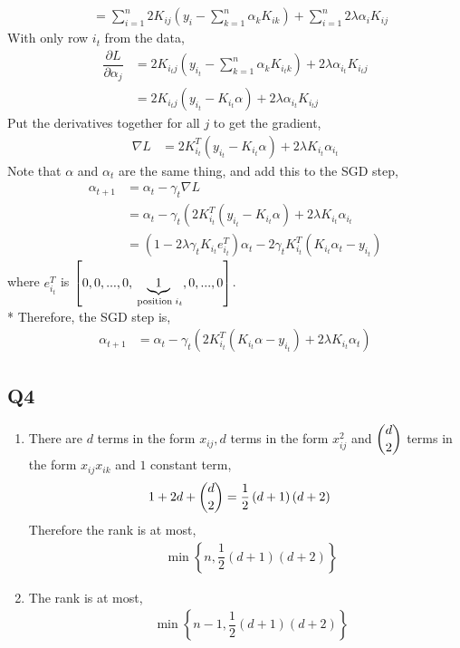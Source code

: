 \documentclass{article}
\begin{document}
\begin{enumerate}
\begin{align*}
\\ &= \displaystyle\sum_{i=1}^{n} 2 K_{ij} \left(y_{i} - \displaystyle\sum_{k=1}^{n} \alpha_{k} K_{ik}\right) + \displaystyle\sum_{i=1}^{n} 2 \lambda \alpha_{i} K_{ij}
\end{align*}
With only row $i_{t}$ from the data,
\begin{align*}
\dfrac{\partial L}{\partial \alpha_{j}} &= 2 K_{i_{t} j} \left(y_{i_{t}} - \displaystyle\sum_{k=1}^{n} \alpha_{k} K_{i_{t} k}\right) + 2 \lambda \alpha_{i_{t}} K_{i_{t} j}
\\ &= 2 K_{i_{t} j} \left(y_{i_{t}} - K_{i_{t}} \alpha\right) + 2 \lambda \alpha_{i_{t}} K_{i_{t} j}
\end{align*}
Put the derivatives together for all $j $ to get the gradient,
\begin{align*}
\nabla  L &= 2 K_{i_{t}}^{T} \left(y_{i_{t}} - K_{i_{t}} \alpha\right) + 2 \lambda K_{i_{t}} \alpha_{i_{t}}
\end{align*}
Note that $\alpha$ and $\alpha_{t}$ are the same thing, and add this to the SGD step,
\begin{align*}
\alpha_{t+1} &= \alpha_{t} - \gamma_{t} \nabla  L
\\ &= \alpha_{t} - \gamma_{t} \left(2 K_{i_{t}}^{T} \left(y_{i_{t}} - K_{i_{t}} \alpha\right) + 2 \lambda K_{i_{t}} \alpha_{i_{t}}\right.
\\ &= \left(1 - 2 \lambda \gamma_{t} K_{i_{t}} e_{i_{t}}^{T}\right) \alpha_{t} - 2 \gamma_{t} K_{i_{t}}^{T} \left(K_{i_{t}} \alpha_{t} - y_{i_{t}}\right)
\end{align*}
where $e_{i_{t}}^{T}$ is $\left[0, 0, ..., 0, \underbrace{1}_{\text{\;position\;} i_{t}}, 0, ..., 0\right]$.
\\* Therefore, the SGD step is,
\begin{align*}
\alpha_{t+1} &= \alpha_{t} - \gamma_{t} \left(2 K_{i_{t}}^{T} \left(K_{i_{t}} \alpha - y_{i_{t}}\right) + 2 \lambda K_{i_{t}} \alpha_{t}\right)
\end{align*}
\end{enumerate}


\subsection{Q4}
\begin{enumerate}
\item There are $d $ terms in the form $x_{ij}, d $ terms in the form $x_{ij}^{2}$ and $\dbinom{d}{2}$ terms in the form $x_{ij} x_{ik}$ and $1$ constant term,
\begin{align*}
1 + 2 d + \dbinom{d}{2} &= \dfrac{1}{2} \left(d + 1\right)\left(d + 2\right)
\end{align*}
Therefore the rank is at most,
\begin{align*}
&\displaystyle\min\left\{n, \dfrac{1}{2} \left(d + 1\right) \left(d + 2\right)\right\}
\end{align*}
\item 
The rank is at most,
\begin{align*}
&\displaystyle\min\left\{n - 1, \dfrac{1}{2} \left(d + 1\right) \left(d + 2\right)\right\}
\end{align*}
\end{enumerate}
\end{document}
